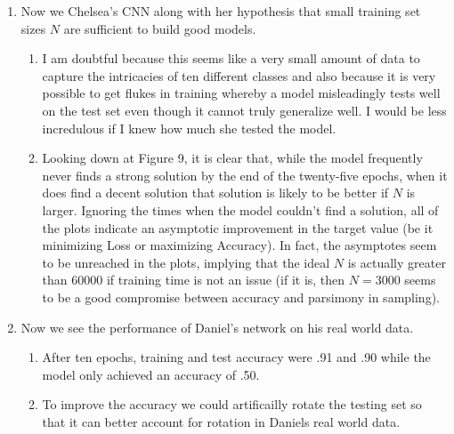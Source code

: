 \documentclass[1pt]{article}
\begin{document}
\begin{enumerate}[label=\arabic*.]
\begin{enumerate}
\end{enumerate}
\item Now we Chelsea's CNN along with her hypothesis that small training set sizes $N$ are sufficient to build good models. 
\begin{enumerate}
    \item I am doubtful because this seems like a very small amount of data to capture the intricacies of ten different classes and also because it is very possible to get flukes in training whereby a model misleadingly tests well on the test set even though it cannot truly generalize well. I would be less incredulous if I knew how much she tested the model. 
    \item Looking down at Figure 9, it is clear that, while the model frequently never finds a strong solution by the end of the twenty-five epochs, when it does find a decent solution that solution is likely to be better if $N$ is larger. Ignoring the times when the model couldn't find a solution, all of the plots indicate an asymptotic improvement in the target value (be it minimizing Loss or maximizing Accuracy). In fact, the asymptotes seem to be unreached in the plots, implying that the ideal $N$ is actually greater than $60000$ if training time is not an issue (if it is, then $N = 3000$ seems to be a good compromise between accuracy and parsimony in sampling). 
\end{enumerate}
\item Now we see the performance of Daniel's network on his real world data.
\begin{enumerate}
    \item After ten epochs, training and test accuracy were .91 and .90 while the model only achieved an accuracy of .50. 
    \item To improve the accuracy we could artificailly rotate the testing set so that it can better account for rotation in Daniels real world data. 

\end{enumerate}
\end{enumerate}
\end{document}

